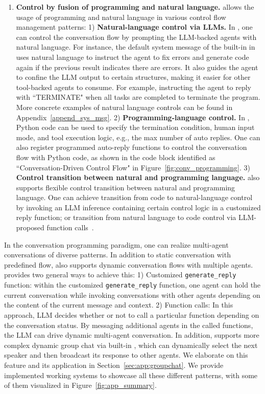 \begin{enumerate}[leftmargin=*]
\item \textbf{Control by fusion of programming and natural language.} \libName allows the usage of programming  and natural language in various control flow management patterns:
1) \textbf{Natural-language control via LLMs.} 
In \libName, one can control the conversation flow by prompting the LLM-backed agents with natural language. 
For instance, the default system message of the built-in \AssistantAgent in \libName uses natural language to instruct the agent to fix errors and generate code again if the previous result indicates there are errors. It also guides the agent to confine the LLM output to certain structures, making it easier for other tool-backed agents to consume. For example, instructing the agent to reply with ``TERMINATE" when all tasks are completed to terminate the program. More concrete examples of natural language controls can be found in Appendix~\ref{append_sys_msg}.  2) \textbf{Programming-language control.} In \libName, Python code can be used to specify the termination condition, human input mode, and tool execution logic, 
e.g., the max number of auto replies. 
    One can also register programmed auto-reply functions to control the conversation flow with Python code, as shown in the code block identified as ``Conversation-Driven
Control Flow" in Figure~\ref{fig:conv_programming}. 
3) \textbf{Control transition between natural and programming language.}  \libName also supports flexible control transition between natural and programming language. 
One can achieve transition from code to natural-language control by invoking an LLM inference containing certain control logic in a customized reply function; or transition from natural language to code control via LLM-proposed function calls~\cite{funccall}.


\end{enumerate}
 
In the conversation programming paradigm, one can realize multi-agent conversations of diverse patterns.
In addition to static conversation with predefined flow, \libName also supports dynamic conversation flows with multiple agents. 
\libName provides two general ways to achieve this: 1) Customized \texttt{generate\_reply} function: within the customized \texttt{generate\_reply} function, one agent can hold the current conversation while invoking conversations with other agents depending on the content of the current message and context.
2) Function calls:  In this approach, LLM decides whether or not to call a particular function depending on the conversation status. By messaging additional agents in the called functions, the LLM can drive dynamic multi-agent conversation. 
In addition, \libName supports more complex dynamic group chat via built-in \groupchatmanager, which can dynamically select the next speaker and then broadcast its response to other agents. We elaborate on this feature and its application in Section~\ref{sec:app:groupchat}.  We provide implemented working systems to showcase all these different patterns, with some of them visualized in Figure~\ref{fig:app_summary}. 


